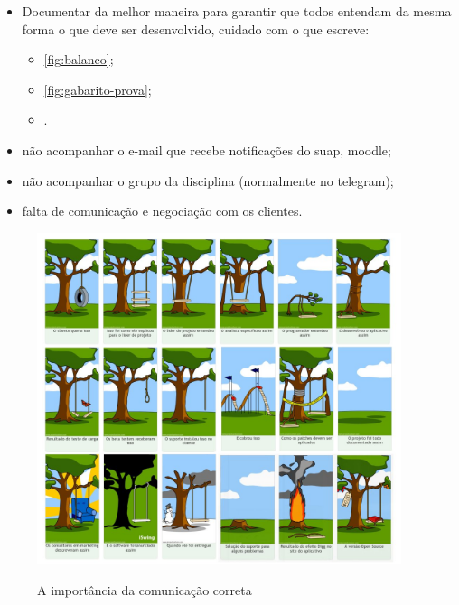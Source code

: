 \begin{itemize}
    \item Documentar da melhor maneira para garantir que todos entendam da mesma forma o que deve ser desenvolvido, cuidado com o que escreve:
    \begin{itemize}
        \item \autoref{fig:balanco};
        
        \item \autoref{fig:gabarito-prova};
        
        \item {}.
    \end{itemize}

    \item não acompanhar o e-mail que recebe notificações do \ac{suap}, \gls{moodle};
    
    \item não acompanhar o grupo da disciplina (normalmente no \gls{telegram});
    
    \item falta de comunicação e negociação com os clientes.
\end{itemize}


\begin{figure}
    \centering
    \caption{A importância da comunicação correta}
	\includegraphics[width=0.95\textwidth]{erros/projeto_balanca_na_arvore.jpg}
    \label{fig:balanco}
\end{figure}


